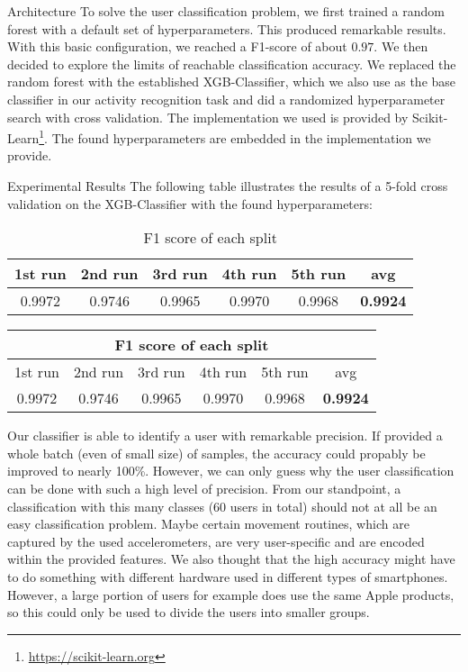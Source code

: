 \begin{subsection}{Architecture}
	To solve the user classification problem, we first trained a random forest with a default set of hyperparameters. This produced remarkable results. With this basic configuration, we reached a F1-score of about $0.97$. We then decided to explore the limits of reachable classification accuracy. We replaced the random forest with the established XGB-Classifier, which we also use as the base classifier in our activity recognition task and did a randomized hyperparameter search with cross validation. The implementation we used is provided by Scikit-Learn\footnote{\href{https://scikit-learn.org/stable/}{https://scikit-learn.org}}. The found hyperparameters are embedded in the implementation we provide.

\end{subsection}

\begin{subsection}{Experimental Results}
	The following table illustrates the results of a 5-fold cross validation on the XGB-Classifier with the found hyperparameters:
	\begin{table}[H]
		\begin{center}
			\begin{tabular}{ c|c|c|c|c|c  }
				\toprule
				1st run &2nd run &3rd run& 4th run & 5th run & avg\\
				\midrule
				0.9972&0.9746&0.9965&0.9970&0.9968&\textbf{0.9924}\\
				
				\bottomrule
			\end{tabular}
			\caption{F1 score of each split}
		\end{center}
	\end{table}
	
	\begin{center}
		\begin{tabular}{ |c|c|c|c|c|c|  }
			\hline
			\multicolumn{6}{|c|}{F1 score of each split} \\
			\hline
			1st run &2nd run &3rd run& 4th run & 5th run & avg\\
			\hline
			0.9972&0.9746&0.9965&0.9970&0.9968&\textbf{0.9924}\\

			\hline
		\end{tabular}
	\end{center}
	Our classifier is able to identify a user with remarkable precision. If provided a whole batch (even of small size) of samples, the accuracy could propably be improved to nearly 100\%. However, we can only guess why the user classification can be done with such a high level of precision. From our standpoint, a classification with this many classes (60 users in total) should not at all be an easy classification problem. Maybe certain movement routines, which are captured by the used accelerometers, are very user-specific and are encoded within the provided features. We also thought that the high accuracy might have to do something with different hardware used in different types of smartphones. However, a large portion of users for example does use the same Apple products, so this could only be used to divide the users into smaller groups. 
\end{subsection}
